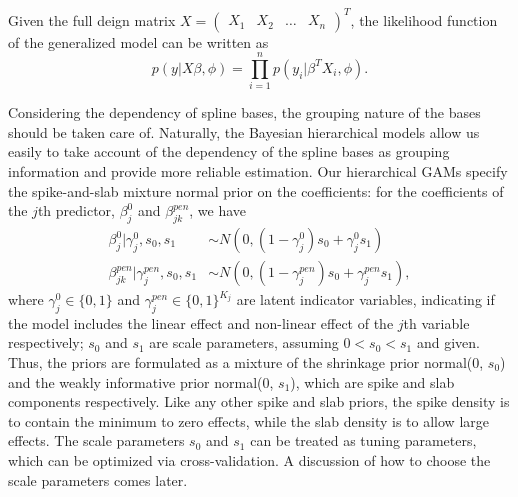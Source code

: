 \documentclass[AMA,STIX1COL,]{WileyNJD-v2}
\begin{document}
Given the full deign matrix
\(X = \begin{pmatrix} X_1 & X_2 & \dots & X_n \end{pmatrix}^T\), the
likelihood function of the generalized model can be written as \[
p(y|X\beta, \phi) = \prod\limits^n_{i=1}p(y_i|\beta^T X_i, \phi).
\]

Considering the dependency of spline bases, the grouping nature of the
bases should be taken care of. Naturally, the Bayesian hierarchical
models allow us easily to take account of the dependency of the spline
bases as grouping information and provide more reliable estimation. Our
hierarchical GAMs specify the spike-and-slab mixture normal prior on the
coefficients: for the coefficients of the \(j\)th predictor,
\(\beta^0_j\) and \(\beta^{pen}_{jk}\), we have \[
\begin{aligned}
  \beta^0_{j} |\gamma^0_{j},s_0,s_1 &\sim N(0,(1-\gamma^0_{j}) s_0 + \gamma^0_{j} s_1)\\
  \beta^{pen}_{jk} | \gamma^{pen}_{j},s_0,s_1 &\sim N(0,(1-\gamma^{pen}_{j}) s_0 + \gamma^{pen}_{j} s_1), 
\end{aligned}
\] where \(\gamma^0_{j}\in\{0,1\}\) and
\(\gamma^{pen}_{j}\in \{0,1\}^{K_j}\) are latent indicator variables,
indicating if the model includes the linear effect and non-linear effect
of the \(j\)th variable respectively; \(s_0\) and \(s_1\) are scale
parameters, assuming \(0 < s_0 < s_1\) and given. Thus, the priors are
formulated as a mixture of the shrinkage prior normal(0, \(s_0\)) and
the weakly informative prior normal(0, \(s_1\)), which are spike and
slab components respectively. Like any other spike and slab priors, the
spike density is to contain the minimum to zero effects, while the slab
density is to allow large effects. The scale parameters \(s_0\) and
\(s_1\) can be treated as tuning parameters, which can be optimized via
cross-validation. A discussion of how to choose the scale parameters
comes later.
\end{document}
